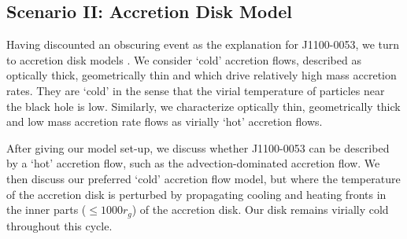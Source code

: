 \documentclass[a4paper,fleqn,usenatbib]{mnras}
\begin{document}
\subsection{Scenario II: Accretion Disk Model}
Having discounted an obscuring event as the explanation for
J1100-0053, we turn to accretion disk models \citep[see also the
recent review by ][]{YuanNarayan2014}. We consider `cold' accretion
flows, described as optically thick, geometrically thin and which drive
relatively high mass accretion rates. They are `cold' in the sense
that the virial temperature of particles near the black hole is
low. Similarly, we characterize optically thin, geometrically thick
and low mass accretion rate flows as virially `hot' accretion flows.

After giving our model set-up, we discuss whether J1100-0053 can be
described by a `hot' accretion flow, such as the advection-dominated
accretion flow. We then discuss our preferred `cold' accretion flow
model, but where the temperature of the accretion disk is perturbed by
propagating cooling and heating fronts in the inner parts ($\leq 1000
r_{g}$) of the accretion disk. Our disk remains virially cold
throughout this cycle.
\end{document}
